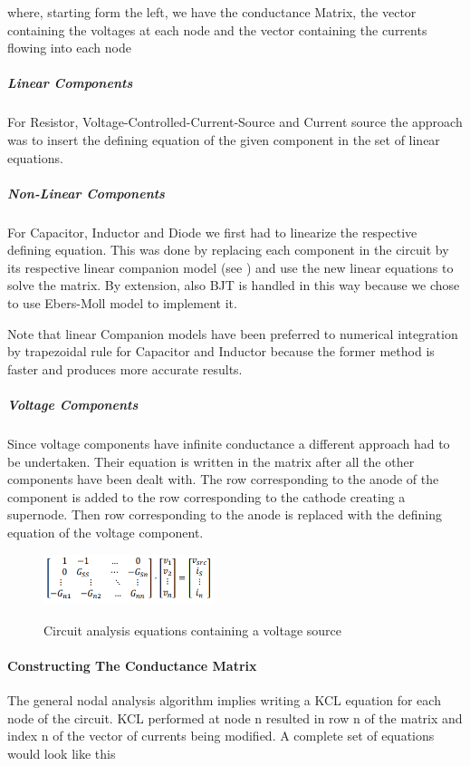 \documentclass{article}
\begin{document}
where, starting form the left, we have the conductance Matrix, the vector containing the voltages at each node and the vector containing the currents flowing into each node
\newpage
\subparagraph{Linear Components}
For Resistor, Voltage-Controlled-Current-Source and Current source the approach was to insert the defining equation of the given component in the set of linear equations. 
\subparagraph{Non-Linear Components}
For Capacitor, Inductor and Diode we first had to linearize the respective defining equation.
This was done by replacing each component in the circuit by its respective linear companion model (see \cite{LinearCompanionModels}) and use the new linear equations to solve the matrix. By extension, also BJT is handled in this way because we chose to use Ebers-Moll model to implement it.\bigbreak

Note that linear Companion models have been preferred to numerical integration by trapezoidal rule for Capacitor and Inductor because the former method is faster and produces more accurate results.
\subparagraph{Voltage Components}
Since voltage components have infinite conductance a different approach had to be undertaken. Their equation is written in the matrix after all the other components have been dealt with. The row corresponding to the anode of the component is added to the row corresponding to the cathode creating a supernode. Then row corresponding to the anode is replaced with the defining equation of the voltage component.
\begin{figure}[h]
    \caption{Circuit analysis equations containing a voltage source}
    \centering
    \includegraphics[width=5cm]{images/Voltage_source_matrix.PNG}
    \label{fig:VoltCompConductanceMat}
\end{figure}

\paragraph{Constructing The Conductance Matrix}
The general nodal analysis algorithm implies writing a KCL equation for each node of the circuit. KCL performed at node n resulted in row n of the matrix and index n of the vector of currents being modified. A complete set of equations would look like this \bigbreak
\end{document}
